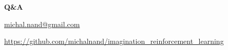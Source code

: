 \documentclass[xcolor=dvipsnames]{beamer}
\begin{document}
\begin{frame}{\bf Q\&A}


\url{michal.nand@gmail.com}

\url{https://github.com/michalnand/imagination_reinforcement_learning}

 
\end{frame}
\end{document}
